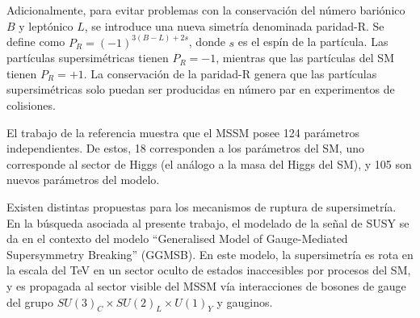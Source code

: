 
 





Adicionalmente, para evitar problemas con la conservación del número bariónico $B$ y leptónico $L$, se introduce una nueva simetría denominada paridad-R. Se define como $P_{R}=(-1)^{3(B-L)+2s}$, donde $s$ es el espín de la partícula. Las partículas supersimétricas tienen $P_{R}=-1$, mientras que las partículas del SM tienen $P_{R}=+1$. La conservación de la paridad-R genera que las partículas supersimétricas solo puedan ser producidas en número par en experimentos de colisiones.

El trabajo de la referencia \cite{Dimopoulos:1995ju} muestra que el MSSM posee 124 parámetros independientes. De estos, 18 corresponden a los parámetros del SM, uno corresponde al sector de Higgs (el análogo a la masa del Higgs del SM), y 105 son nuevos parámetros del modelo. 

Existen distintas propuestas para los mecanismos de ruptura de supersimetría. En la búsqueda asociada al presente trabajo, el modelado de la señal de SUSY se da en el contexto del modelo “Generalised Model of Gauge-Mediated Supersymmetry Breaking” (GGMSB). En este modelo, la supersimetría es rota en la escala del TeV en un sector oculto de estados inaccesibles por procesos del SM, y es propagada al sector visible del MSSM vía interacciones de bosones de gauge del grupo $SU(3)_{C} \times SU(2)_{L} \times U(1)_{Y}$ y gauginos.

